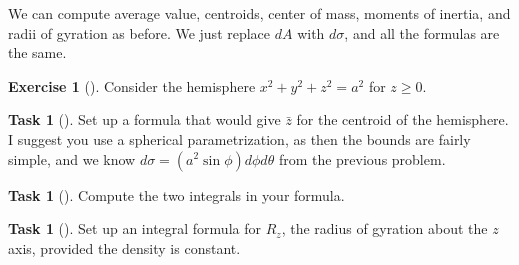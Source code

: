 \documentclass[10pt,]{book}
\theoremstyle{plain}
\theoremstyle{definition}
\theoremstyle{definition}
\theoremstyle{definition}
\theoremstyle{definition}
\newtheorem{exploration}[project]{Exercise}
\newtheorem{task}[project]{Task}
\theoremstyle{definition}
\numberwithin{equation}{section}
\begin{document}
We can compute average value, centroids, center of mass, moments of inertia, and radii of gyration as before. We just replace \(dA\) with \(d\sigma\), and all the formulas are the same.%
\begin{exploration}[]\label{exploration-282}
Consider the hemisphere \(x^2+y^2+z^2=a^2\) for \(z\geq 0\).%
\begin{task}[]\label{task-763}
Set up a formula that would give \(\bar z\) for the centroid of the hemisphere. I suggest you use a spherical parametrization, as then the bounds are fairly simple, and we know \(d\sigma = (a^2\sin\phi) d\phi d\theta\) from the previous problem.%
\end{task}
\begin{task}[]\label{task-764}
Compute the two integrals in your formula.%
\end{task}
\begin{task}[]\label{task-765}
Set up an integral formula for \(R_z\), the radius of gyration about the \(z\) axis, provided the density is constant.%
\end{task}
\end{exploration}
\typeout{************************************************}
\typeout{************************************************}
\end{document}
